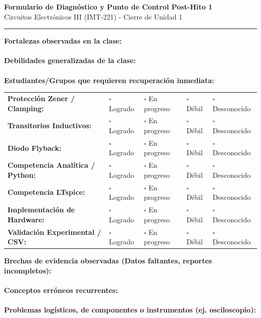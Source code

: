 \documentclass[11pt, a4paper]{article}
\begin{document}
\begin{center}
    {\Large \textbf{Formulario de Diagnóstico y Punto de Control Post-Hito 1}}\\[0.2cm]
    {\large Circuitos Electrónicos III (IMT-221) - Cierre de Unidad 1}
\end{center}
\hrule
\vspace{0.4cm}

\begin{tcolorbox}[colback=white, colframe=black, title=\textbf{Resumen de la Sesión}]
\textbf{Fortalezas observadas en la clase:}\\[0.3cm] \hrulefill \\[0.3cm]
\textbf{Debilidades generalizadas de la clase:}\\[0.3cm] \hrulefill \\[0.3cm]
\textbf{Estudiantes/Grupos que requieren recuperación inmediata:}\\[0.3cm] \hrulefill 
\end{tcolorbox}

\begin{tcolorbox}[colback=white, colframe=black, title=\textbf{Estado por Dominio Técnico}]
\begin{tabularx}{\textwidth}{l X X X X}
\textbf{Protección Zener / Clamping:} & $\square$ Logrado & $\square$ En progreso & $\square$ Débil & $\square$ Desconocido \\
\textbf{Transitorios Inductivos:} & $\square$ Logrado & $\square$ En progreso & $\square$ Débil & $\square$ Desconocido \\
\textbf{Diodo Flyback:} & $\square$ Logrado & $\square$ En progreso & $\square$ Débil & $\square$ Desconocido \\
\textbf{Competencia Analítica / Python:} & $\square$ Logrado & $\square$ En progreso & $\square$ Débil & $\square$ Desconocido \\
\textbf{Competencia LTspice:} & $\square$ Logrado & $\square$ En progreso & $\square$ Débil & $\square$ Desconocido \\
\textbf{Implementación de Hardware:} & $\square$ Logrado & $\square$ En progreso & $\square$ Débil & $\square$ Desconocido \\
\textbf{Validación Experimental / CSV:} & $\square$ Logrado & $\square$ En progreso & $\square$ Débil & $\square$ Desconocido \\
\end{tabularx}
\end{tcolorbox}

\begin{tcolorbox}[colback=white, colframe=black, title=\textbf{Registro Cualitativo}]
\textbf{Brechas de evidencia observadas (Datos faltantes, reportes incompletos):}\\[0.4cm] \hrulefill \\[0.4cm]
\textbf{Conceptos erróneos recurrentes:}\\[0.4cm] \hrulefill \\[0.4cm]
\textbf{Problemas logísticos, de componentes o instrumentos (ej. osciloscopio):}\\[0.4cm] \hrulefill 
\end{tcolorbox}
\end{document}
